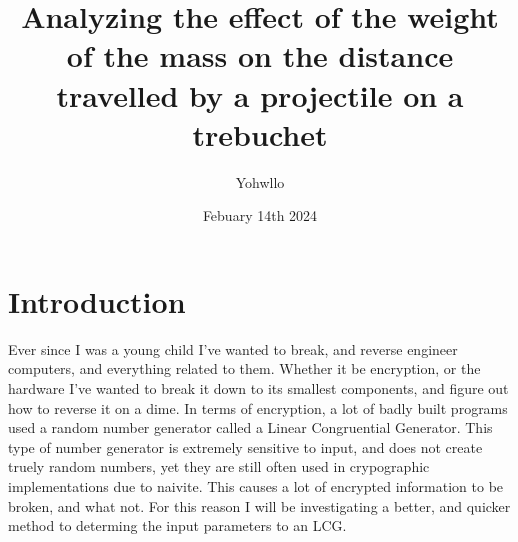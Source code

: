 \documentclass{article}
\begin{document}
\title{Analyzing the effect of the weight of the mass on the distance travelled by a projectile on a trebuchet}
\author{Yohwllo}
\date{Febuary 14th 2024}

\maketitle

\pagebreak
\tableofcontents

\pagebreak

\section{Introduction}
Ever since I was a young child I've wanted to break, and reverse engineer computers, and everything related to them. Whether it be encryption, or the hardware I've wanted to break it down to its smallest components, and figure out how to reverse it on a dime. In terms of encryption, a lot of badly built programs used a random number generator called a Linear Congruential Generator. This type of number generator is extremely sensitive to input, and does not create truely random numbers, yet they are still often used in crypographic implementations due to naivite. This causes a lot of encrypted information to be broken, and what not. For this reason I will be investigating a better, and quicker method to determing the input parameters to an LCG.
\end{document}
